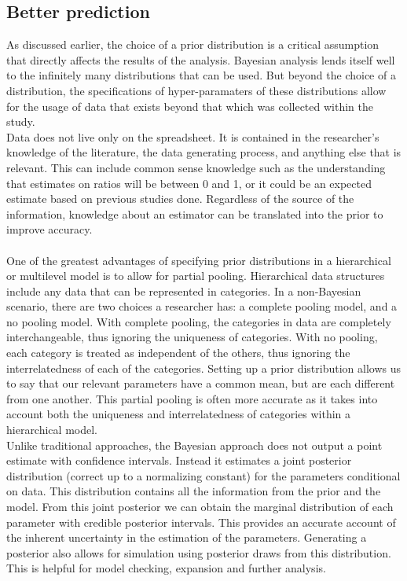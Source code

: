 \documentclass{article}
\begin{document}
\subsection{Better prediction}
As discussed earlier, the choice of a prior distribution is a critical assumption that directly affects the results of the analysis. Bayesian analysis lends itself well to the infinitely many distributions that can be used. But beyond the choice of a distribution, the specifications of hyper-paramaters of these distributions allow for the usage of data that exists beyond that which was collected within the study.\\
Data does not live only on the spreadsheet. It is contained in the researcher's knowledge of the literature, the data generating process, and anything else that is relevant. This can include common sense knowledge such as the understanding that estimates on ratios will be between 0 and 1, or it could be an expected estimate based on previous studies done. Regardless of the source of the information, knowledge about an estimator can be translated into the prior to improve accuracy. \\ \\
One of the greatest advantages of specifying prior distributions in a hierarchical or multilevel model is to allow for partial pooling. Hierarchical data structures include any data that can be represented in categories. In a non-Bayesian scenario, there are two choices a researcher has: a complete pooling model, and a no pooling model. With complete pooling, the categories in data are completely interchangeable, thus ignoring the uniqueness of categories. With no pooling, each category is treated as independent of the others, thus ignoring the interrelatedness of each of the categories. Setting up a prior distribution allows us to say that our relevant parameters have a common mean, but are each different from one another. This partial pooling is often more accurate as it takes into account both the uniqueness and interrelatedness of categories within a hierarchical model.\\
Unlike traditional approaches, the Bayesian approach does not output a point estimate with confidence intervals. Instead it estimates a joint posterior distribution (correct up to a normalizing constant) for the parameters conditional on data. This distribution contains all the information from the prior and the model. From this joint posterior we can obtain the marginal distribution of each parameter with credible posterior intervals. This provides an accurate account of the inherent uncertainty in the estimation of the parameters. Generating a posterior also allows for simulation using posterior draws from this distribution. This is helpful for model checking, expansion and further analysis. \\
\end{document}
